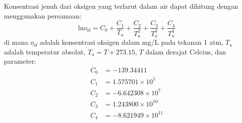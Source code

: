 \begin{soal}
Konsentrasi jenuh dari oksigen yang terlarut dalam air dapat
dihitung dengan menggunakan persamaan:
\begin{equation*}
\mathrm{ln}o_{\mathrm{sf}} = C_{0} + \frac{C_{1}}{T_{a}} +
\frac{C_{2}}{T_{a}^{2}} + \frac{C_{3}}{T_{a}^{3}} +
\frac{C_{4}}{T_{a}^{4}}
\end{equation*}
di mana $o_{\mathrm{sf}}$ adalah konsentrasi oksigen dalam mg/L pada tekanan
1 atm, $T_{a}$ adalah temperatur absolut, $T_{a} = T + 273.15$, $T$ dalam
derajat Celcius, dan parameter:
\begin{align*}
C_{0} & = -139.34411 \\
C_{1} & = 1.575701 \times 10^5 \\
C_{2} & = -6.642308 \times 10^7 \\
C_{3} & = 1.243800 \times 10^{10} \\
C_{4} & = -8.621949 \times 10^{11} \\
\end{align*}
\end{soal}